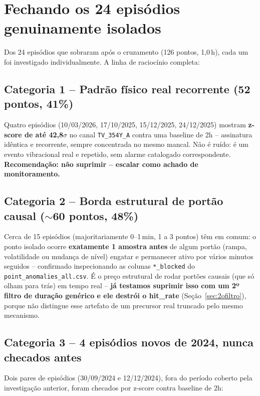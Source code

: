 \documentclass[11pt,a4paper]{article}
\begin{document}
\section{Fechando os 24 episódios genuinamente isolados}
\label{sec:fechamento24}

Dos 24 episódios que sobraram após o cruzamento (126 pontos, 1,0\,h),
cada um foi investigado individualmente. A linha de raciocínio completa:

\subsection{Categoria 1 -- Padrão físico real recorrente (52 pontos, 41\%)}

Quatro episódios (10/03/2026, 17/10/2025, 15/12/2025, 24/12/2025)
mostram \textbf{z-score de até 42,8$\sigma$} no canal
\texttt{TV\_354Y\_A} contra uma baseline de 2h -- assinatura idêntica
e recorrente, sempre concentrada no mesmo mancal. Não é ruído: é um
evento vibracional real e repetido, sem alarme catalogado
correspondente. \textbf{Recomendação: não suprimir -- escalar como
achado de monitoramento.}

\subsection{Categoria 2 -- Borda estrutural de portão causal ($\sim$60 pontos, 48\%)}

Cerca de 15 episódios (majoritariamente 0--1\,min, 1 a 3 pontos) têm
em comum: o ponto isolado ocorre \textbf{exatamente 1 amostra antes}
de algum portão (rampa, volatilidade ou mudança de nível) engatar e
permanecer ativo por vários minutos seguidos -- confirmado inspecionando
as colunas \texttt{*\_blocked} do \texttt{point\_anomalies\_all.csv}.
É o preço estrutural de rodar portões causais (que só olham para trás)
em tempo real -- \textbf{já testamos suprimir isso com um 2º filtro de
duração genérico e ele destrói o hit\_rate} (Seção~\ref{sec:2ofiltro}),
porque não distingue esse artefato de um precursor real truncado pelo
mesmo mecanismo.

\subsection{Categoria 3 -- 4 episódios novos de 2024, nunca checados antes}

Dois pares de episódios (30/09/2024 e 12/12/2024), fora do período
coberto pela investigação anterior, foram checados por z-score contra
baseline de 2h:
\end{document}
